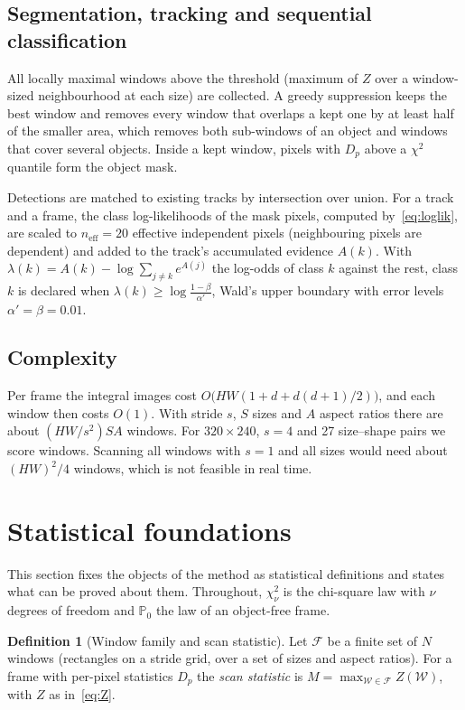 \documentclass[11pt,a4paper]{article}
\theoremstyle{definition}
\newtheorem{definition}{Definition}
\newcommand{\Pp}{\mathbb{P}}
\begin{document}
\subsection{Segmentation, tracking and sequential classification}\label{sec:track}
All locally maximal windows above the threshold (maximum of $Z$ over a window-sized neighbourhood at each size) are collected.
A greedy suppression keeps the best window and removes every window that overlaps a kept one by at least half of the smaller area, which removes both sub-windows of an object and windows that cover several objects.
Inside a kept window, pixels with $D_p$ above a $\chi^2$ quantile form the object mask.

Detections are matched to existing tracks by intersection over union.
For a track and a frame, the class log-likelihoods of the mask pixels, computed by~\eqref{eq:loglik}, are scaled to $n_{\mathrm{eff}}=20$ effective independent pixels (neighbouring pixels are dependent) and added to the track's accumulated evidence $A(k)$.
With $\lambda(k)=A(k)-\log\sum_{j\ne k}e^{A(j)}$ the log-odds of class $k$ against the rest, class $k$ is declared when $\lambda(k)\ge\log\frac{1-\beta}{\alpha'}$, Wald's upper boundary with error levels $\alpha'=\beta=0.01$.

\subsection{Complexity}\label{sec:complexity}
Per frame the integral images cost $O\big(HW(1+d+d(d+1)/2)\big)$, and each window then costs $O(1)$.
With stride $s$, $S$ sizes and $A$ aspect ratios there are about $(HW/s^2)SA$ windows.
For $320\times240$, $s=4$ and 27 size--shape pairs we score \NwinPerFrame{} windows.
Scanning all windows with $s=1$ and all sizes would need about $(HW)^2/4$ windows, which is not feasible in real time.

\section{Statistical foundations}\label{sec:foundations}
This section fixes the objects of the method as statistical definitions and states what can be proved about them.
Throughout, $\chi^2_\nu$ is the chi-square law with $\nu$ degrees of freedom and $\Pp_0$ the law of an object-free frame.

\begin{definition}[Window family and scan statistic]
Let $\mathcal F$ be a finite set of $N$ windows (rectangles on a stride grid, over a set of sizes and aspect ratios).
For a frame with per-pixel statistics $D_p$ the \emph{scan statistic} is $M=\max_{\mathcal W\in\mathcal F}Z(\mathcal W)$, with $Z$ as in~\eqref{eq:Z}.
\end{definition}
\end{document}
